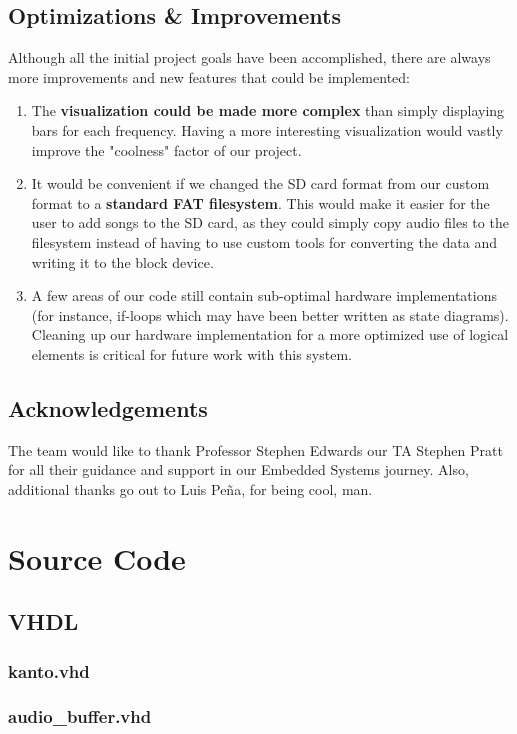 \documentclass{article}
\begin{document}
\subsection{Optimizations \& Improvements}

Although all the initial project goals have been accomplished, there are always 
more improvements and new features that could be implemented: 
\begin{enumerate}
	\item The \textbf{visualization could be made more complex} than simply 
	displaying bars for each frequency. Having a more interesting visualization 
	would vastly improve the "coolness" factor of our project.
	\item It would be convenient if we changed the SD card format from our custom 
	format to a \textbf{standard FAT filesystem}. This would make it easier for the 
	user to add songs to the SD card, as they could simply copy audio files to the 
	filesystem instead of having to use custom tools for converting the data and 
	writing it to the block device.
	\item A few areas of our code still contain sub-optimal hardware
	implementations (for instance, if-loops which may have been better written
	as state diagrams). Cleaning up our hardware implementation for a more
	optimized use of logical elements is critical for future work with this system.
\end{enumerate}
\subsection{Acknowledgements}
The team would like to thank Professor Stephen Edwards our TA Stephen Pratt for all their guidance and support in our Embedded Systems journey. Also, additional thanks go out to Luis Pe\~{n}a, for being cool, man.

\newpage
\appendix

\section{Source Code}
\subsection{VHDL}
	\subsubsection{kanto.vhd}
	
	\subsubsection{audio\_buffer.vhd}
	
\end{document}
